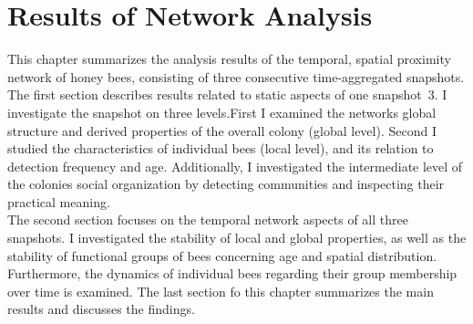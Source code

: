 \chapter{Results of Network Analysis}
\label{ch:results}
This chapter summarizes the analysis results of the temporal, spatial proximity network of honey bees, consisting of three consecutive time-aggregated snapshots.\\
The first section describes results related to static aspects of one snapshot~3.
I investigate the snapshot on three levels.First I examined the networks global structure and derived properties of the overall colony (global level). Second I studied the characteristics of individual bees (local level), and its relation to detection frequency and age.
Additionally, I investigated the intermediate level of the colonies social organization by detecting communities and inspecting their practical meaning.\\
The second section focuses on the temporal network aspects of all three snapshots.
I investigated the stability of local and global properties, as well as the stability of functional groups of bees concerning age and spatial distribution. Furthermore, the dynamics of individual bees regarding their group membership over time is examined.
The last section fo this chapter summarizes the main results and discusses the findings.


\newpage

